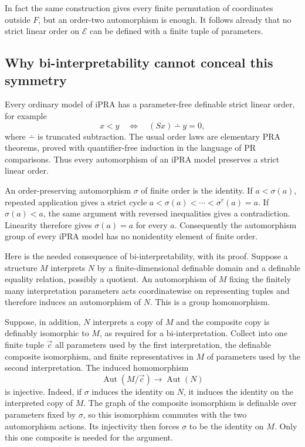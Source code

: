 In fact the same construction gives every finite permutation of
coordinates outside $F$, but an order-two automorphism is enough.
It follows already that no strict linear order on $\mathcal E$ can
be defined with a finite tuple of parameters.

\subsection{Why bi-interpretability cannot conceal this symmetry}

Every ordinary model of iPRA has a parameter-free definable strict
linear order, for example
\[
 x<y\quad\Longleftrightarrow\quad (Sx)\mathbin{\dotminus}y=0,
\]
where $\dotminus$ is truncated subtraction.  The usual order laws
are elementary PRA theorems, proved with quantifier-free induction in
the language of PR comparisons.  Thus every automorphism of an iPRA
model preserves a strict linear order.

An order-preserving automorphism $\sigma$ of finite order is the
identity.  If $a<\sigma(a)$, repeated application gives a strict cycle
$a<\sigma(a)<\cdots<\sigma^r(a)=a$.  If $\sigma(a)<a$, the same
argument with reversed inequalities gives a contradiction.  Linearity
therefore gives $\sigma(a)=a$ for every $a$.  Consequently the
automorphism group of every iPRA model has no nonidentity element
of finite order.

Here is the needed consequence of bi-interpretability, with its proof.
Suppose a structure $M$ interprets $N$ by a finite-dimensional
definable domain and a definable equality relation, possibly a quotient.
An automorphism of $M$ fixing the finitely many interpretation
parameters acts coordinatewise on representing tuples and therefore
induces an automorphism of $N$.  This is a group homomorphism.

Suppose, in addition, $N$ interprets a copy of $M$ and the composite
copy is definably isomorphic to $M$, as required for a bi-interpretation.
Collect into one finite tuple $\vec c$ all parameters used by the
first interpretation, the definable composite isomorphism, and finite
representatives in $M$ of parameters used by the second interpretation.
The induced homomorphism
\[
 \operatorname{Aut}(M/\vec c)\longrightarrow\operatorname{Aut}(N)
 \tag{Automorphism action}
\]
is injective.  Indeed, if $\sigma$ induces the identity on $N$, it
induces the identity on the interpreted copy of $M$.  The graph of
the composite isomorphism is definable over parameters fixed by
$\sigma$, so this isomorphism commutes with the two automorphism
actions.  Its injectivity then forces $\sigma$ to be the identity on
$M$.  Only this one composite is needed for the argument.

